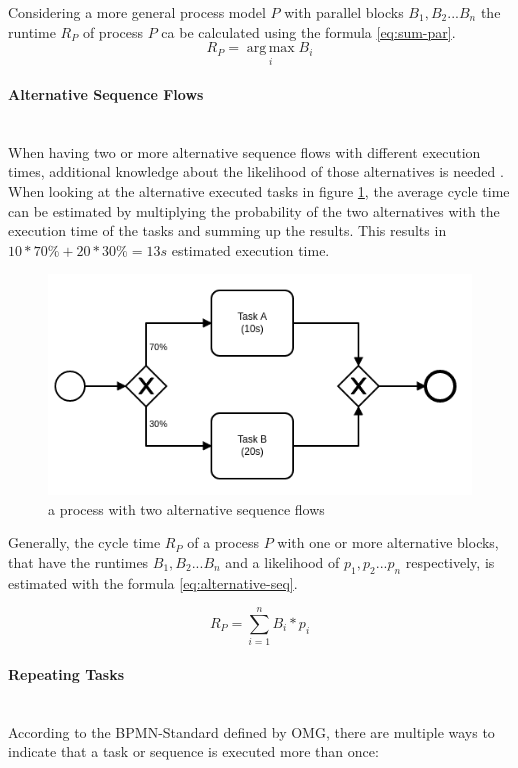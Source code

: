 Considering a more general process model $P$ with parallel blocks $B_1,B_2 ... B_n$ the runtime $R_P$ of process $P$ ca be calculated using the formula \ref{eq:sum-par}. 
\begin{equation}\label{eq:sum-par}
	R_P = \operatorname*{arg\,max}_i B_i
\end{equation}

\paragraph{Alternative Sequence Flows}~\\
When having two or more alternative sequence flows with different execution times, additional knowledge about the likelihood of those alternatives is needed \cite{fundamentals}. When looking at the alternative executed tasks in figure \ref{fig:alternative-tasks}, the average cycle time can be estimated by multiplying the probability of the two alternatives with the execution time of the tasks and summing up the results. This results in $10 * 70\% + 20 * 30\% = 13s$ estimated execution time. 

\begin{figure}[H]
	\centering
	\includegraphics[width=0.5\columnwidth]{graphics/alternative-tasks}
	\caption{a process with two alternative sequence flows} 
	\label{fig:alternative-tasks} 
\end{figure}

Generally, the cycle time $R_P$ of a process $P$ with one or more alternative blocks, that have the runtimes $B_1,B_2 ... B_n$ and a likelihood of $p_1,p_2 ... p_n$ respectively, is estimated with the formula \ref{eq:alternative-seq}. \cite{fundamentals}

\begin{equation}\label{eq:alternative-seq}
	R_P = \displaystyle\sum_{i=1}^{n} B_i * p_i
\end{equation}

\paragraph{Repeating Tasks}~\\
According to the BPMN-Standard\cite{bpmnstandard} defined by OMG, there are multiple ways to indicate that a task or sequence is executed more than once: 

